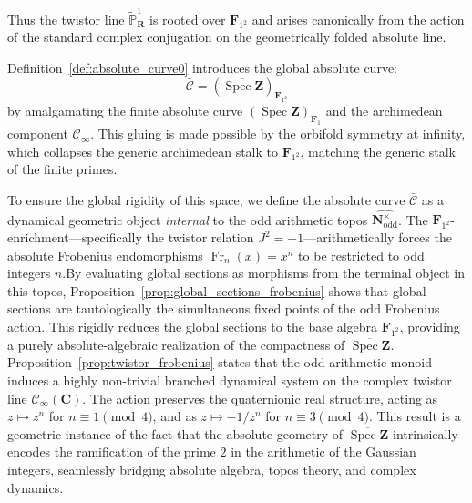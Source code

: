 \documentclass[11pt,a4paper]{article}
\let\mathscr\mathscr
\newcommand{\C}{\mathbf{C}}
\newcommand{\N}{\mathbf{N}}
\renewcommand{\P}{\mathbb{P}}
\newcommand{\R}{\mathbf{R}}
\newcommand{\Z}{\mathbf{Z}}
\newcommand{\Fone}{\mathbf{F}_{1}}
\newcommand{\Ftwo}{\mathbf{F}_{1^2}}
\def\spz{\Spec \Z}
\def\spzb{\overline{\Spec \Z}}
\newcommand{\minf}{\mathscr C_\infty}
\newcommand{\frob}{{\operatorname{Fr}}}
\newcommand{\Spec}{\operatorname{Spec}}
\begin{document}
Thus the twistor  line $\widetilde{\P}_\R^1$ is rooted over $\Ftwo$ and arises canonically from the action of the standard complex conjugation on the geometrically folded absolute line. \vspace{.03in}

 Definition~\ref{def:absolute_curve0} introduces the global absolute curve:
$$\bar{\mathscr{C}} = (\overline{\Spec \Z})_{\Ftwo}$$ by amalgamating the finite absolute curve $(\spz)_{\Fone}$ and the archimedean component $\minf$. This gluing is made possible by the orbifold symmetry at infinity, which collapses the generic archimedean stalk to $\Ftwo$,  matching the generic stalk of the finite primes. 

To ensure the global rigidity of this space, we define the absolute curve $\bar{\mathscr C}$ as a dynamical geometric object \emph{internal} to the odd arithmetic topos $\widehat{\N^\times_{\text{odd}}}$.\newline
The $\Ftwo$-enrichment—specifically the twistor relation $J^2 = -1$—arithmetically forces the absolute Frobenius endomorphisms $\frob_n(x) = x^n$ to be restricted to odd integers $n$.\newline By evaluating global sections as morphisms from the terminal object in this topos, Proposition~\ref{prop:global_sections_frobenius} shows that global sections are tautologically the simultaneous fixed points of the odd Frobenius action. This rigidly reduces the global sections to the base algebra $\Ftwo$, providing a purely absolute-algebraic realization of the  compactness of $\spzb$.\newline
Proposition~\ref{prop:twistor_frobenius} states that the odd arithmetic monoid induces a highly non-trivial \sloppy branched dynamical system on the complex twistor line $\minf(\C)$. The action  preserves the quaternionic real structure, acting as $z \mapsto z^n$ for $n \equiv 1 \pmod 4$, and as $z \mapsto -1/z^n$ for $n \equiv 3 \pmod 4$. 
This result is a geometric instance of the fact that the absolute geometry of $\overline{\Spec \Z}$ intrinsically encodes the ramification of the prime $2$ in the arithmetic of the Gaussian integers, seamlessly bridging absolute algebra, topos theory, and complex dynamics.\vspace{.05in}
\end{document}
